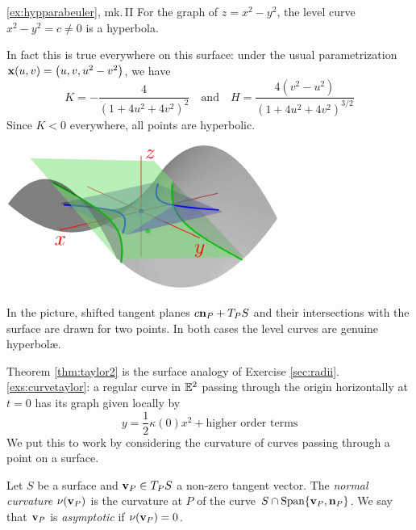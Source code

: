 \begin{example*}{\ref{ex:hypparabeuler}, mk.\,II}{}
For the graph of $z=x^2-y^2$, the level curve $x^2-y^2=c\neq 0$ is a hyperbola.\par
\begin{minipage}[t]{0.63\linewidth}\vspace{-5pt}
In fact this is true everywhere on this surface: under the usual parametrization ${\mathbf{x}}(u,v)=\bigl(u,v,u^2-v^2\bigr)$, we have
\[K=-\frac{4}{(1+4u^2+4v^2)^2}\quad\text{and}\quad  H=\frac{4(v^2-u^2)}{(1+4u^2+4v^2)^{3/2}}\]
Since $K<0$ everywhere, all points are hyperbolic.
\end{minipage}\hfill\begin{minipage}[t]{0.36\linewidth}\vspace{0pt}
\flushright\href{http://www.math.uci.edu/~ndonalds/math162a/euler-setup3.html}{\includegraphics{euler-setup3}}
\end{minipage}\smallbreak
In the picture, shifted tangent planes $c{\mathbf{n}}_P+T_PS$ and their intersections with the surface are drawn for two points. In both cases the level curves are genuine hyperbolæ.
\end{example*}




Theorem \ref{thm:taylor2} is the surface analogy of Exercise \ref*{sec:radii}.\ref{exs:curvetaylor}: a regular curve in $\mathbb{E}^2$ passing through the origin horizontally at $t=0$ has its graph given locally by
\[y=\frac 12\kappa(0)x^2+\text{higher order terms}\tag{$\ast$}\]
We put this to work by considering the curvature of curves passing through a point on a surface.

\begin{defn}{}{}
Let $S$ be a surface and ${\mathbf{v}}_P\in T_PS$ a non-zero tangent vector.\smallbreak
The \emph{normal curvature} $\nu({\mathbf{v}}_P)$ is the curvature at $P$ of the curve\footnotemark{} $S\cap\operatorname{Span}\{{\mathbf{v}}_P,{\mathbf{n}}_P\}$.\smallbreak
We say that ${\mathbf{v}}_P$ is \emph{asymptotic} if $\nu({\mathbf{v}}_P)=0$.
\end{defn}


